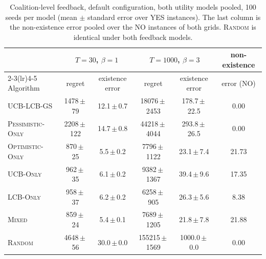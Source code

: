 \begin{table}[h]
\centering\small\setlength{\tabcolsep}{4pt}
\caption{Coalition-level feedback, default configuration, both utility models pooled, 100 seeds per model (mean $\pm$ standard error over YES instances). The last column is the non-existence error pooled over the NO instances of both grids. \textsc{Random} is identical under both feedback models.}
\label{tab:bandit-main}
\begin{tabular}{lccccc}
\toprule
& \multicolumn{2}{c}{$T=30$, $\beta=1$} & \multicolumn{2}{c}{$T=1000$, $\beta=3$} & non-existence \\ \cmidrule(lr){2-3}\cmidrule(lr){4-5}
Algorithm & regret & existence error & regret & existence error & error (NO) \\
\midrule
\textsc{UCB-LCB-GS} & 1478\,$\pm$\,79 & 12.1\,$\pm$\,0.7 & 18076\,$\pm$\,2453 & 178.7\,$\pm$\,22.5 & 0.00 \\
\textsc{Pessimistic-Only} & 2208\,$\pm$\,122 & 14.7\,$\pm$\,0.8 & 44218\,$\pm$\,4044 & 293.8\,$\pm$\,26.5 & 0.00 \\
\textsc{Optimistic-Only} & 870\,$\pm$\,25 & 5.5\,$\pm$\,0.2 & 7796\,$\pm$\,1122 & 23.1\,$\pm$\,7.4 & 21.73 \\
\textsc{UCB-Only} & 962\,$\pm$\,35 & 6.1\,$\pm$\,0.2 & 9382\,$\pm$\,1367 & 39.4\,$\pm$\,9.6 & 17.35 \\
\textsc{LCB-Only} & 958\,$\pm$\,37 & 6.2\,$\pm$\,0.2 & 6258\,$\pm$\,905 & 26.3\,$\pm$\,5.6 & 8.38 \\
\textsc{Mixed} & 859\,$\pm$\,24 & 5.4\,$\pm$\,0.1 & 7689\,$\pm$\,1205 & 21.8\,$\pm$\,7.8 & 21.88 \\
\textsc{Random} & 4648\,$\pm$\,56 & 30.0\,$\pm$\,0.0 & 155215\,$\pm$\,1569 & 1000.0\,$\pm$\,0.0 & 0.00 \\
\bottomrule
\end{tabular}
\end{table}
